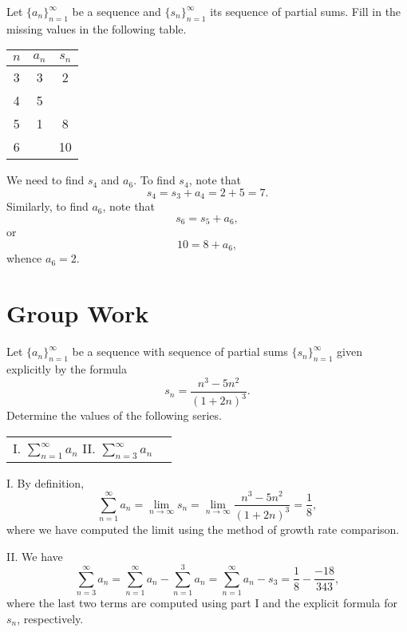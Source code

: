 \documentclass[]{ximera}
\begin{document}
\begin{problem}
Let $\{a_n\}_{n=1}^\infty$ be a sequence and $\{s_n\}_{n=1}^\infty$ its sequence of partial sums. Fill in the missing values in the following table.

\begin{center}
\begin{tabular}{ |c|c|c| } 
 \hline
$n$ & $a_n$ & $s_n$ \\ 
 \hline
 \hline
  3 & 3 & 2 \\ 
  \hline
    4 & 5 &  \\ 
 \hline
   5 & 1 & 8 \\ 
 \hline
   6 &  & 10 \\ 
 \hline
\end{tabular}
\end{center}

\end{problem}

\begin{freeResponse}
We need to find $s_4$ and $a_6$. To find $s_4$, note that 
$$
s_4 = s_3 + a_4 = 2 + 5 = 7.
$$
Similarly, to find $a_6$, note that
$$
s_6 = s_5 + a_ 6,
$$
or 
$$
10 = 8 + a_6,
$$
whence $a_6 = 2$. 
\end{freeResponse}

\section{Group Work}

\begin{problem}
Let $\{a_n\}_{n=1}^\infty$ be a sequence with sequence of partial sums $\{s_n\}_{n=1}^\infty$ given explicitly by the formula
$$
s_n = \frac{n^3-5n^2}{(1+2n)^3}.
$$
Determine the values of the following series.
\begin{center}
\begin{tabular}{ll}
I. $\sum_{n=1}^\infty a_n$ \hspace{.6in} II. $\sum_{n=3}^\infty a_n$
\end{tabular}
\end{center}
\end{problem}

\begin{freeResponse}
I. By definition, 
$$
\sum_{n=1}^\infty a_n = \lim_{n\rightarrow \infty} s_n = \lim_{n\rightarrow \infty}\frac{n^3-5n^2}{(1+2n)^3} = \frac{1}{8},
$$
where we have computed the limit using the method of growth rate comparison.

II. We have
$$
\sum_{n=3}^\infty a_n = \sum_{n=1}^\infty a_n - \sum_{n=1}^3 a_n = \sum_{n=1}^\infty a_n - s_3 = \frac{1}{8} - \frac{-18}{343},
$$
where the last two terms are computed using part I and the explicit formula for $s_n$, respectively.
\end{freeResponse}
\end{document}
